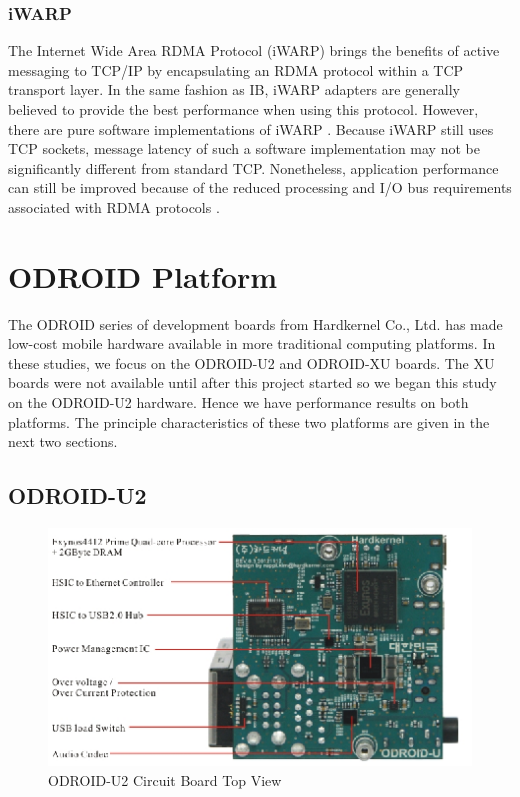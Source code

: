 \documentclass[11pt]{book}
\begin{document}
\subsubsection{iWARP}

The Internet Wide Area RDMA Protocol (iWARP) brings the benefits of active messaging to
TCP/IP by encapsulating an RDMA protocol within a TCP transport layer.  In the same
fashion as IB, iWARP adapters are generally believed to provide the best performance when
using this protocol.  However, there are pure software implementations of iWARP
\cite{neeser-10}.  Because iWARP still uses TCP sockets, message latency of such a
software implementation may not be significantly different from standard TCP.
Nonetheless, application performance can still be improved because of the reduced
processing and I/O bus requirements associated with RDMA protocols \cite{narravula-07}.

\section{ODROID Platform}

The ODROID series of development boards from Hardkernel Co., Ltd. has made low-cost mobile
hardware available in more traditional computing platforms.  In these studies, we focus on
the ODROID-U2 and ODROID-XU boards.  The XU boards were not available until after this
project started so we began this study on the ODROID-U2 hardware.  Hence we have
performance results on both platforms.  The principle characteristics of these two
platforms are given in the next two sections.

\subsection{ODROID-U2}

\begin{figure}
\includegraphics[width=\textwidth]{odroid_u2_top}
\caption{ODROID-U2 Circuit Board Top View \cite{odroid-u2-board-detail}}\label{odroid-u2-board}
\end{figure}
\end{document}

